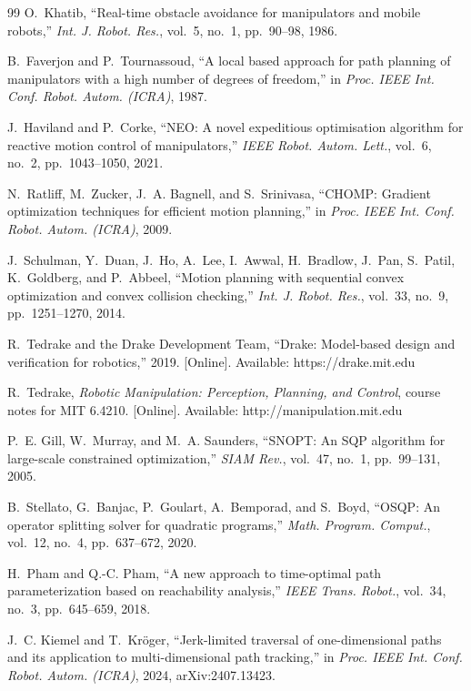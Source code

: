 \documentclass[conference]{IEEEtran}
\begin{document}
\begin{thebibliography}{99}
O.~Khatib, ``Real-time obstacle avoidance for manipulators and mobile robots,'' \emph{Int. J. Robot.
Res.}, vol.~5, no.~1, pp.~90--98, 1986.

B.~Faverjon and P.~Tournassoud, ``A local based approach for path planning of manipulators with a high
number of degrees of freedom,'' in \emph{Proc. IEEE Int. Conf. Robot. Autom. (ICRA)}, 1987.

J.~Haviland and P.~Corke, ``NEO: A novel expeditious optimisation algorithm for reactive motion control
of manipulators,'' \emph{IEEE Robot. Autom. Lett.}, vol.~6, no.~2, pp.~1043--1050, 2021.

N.~Ratliff, M.~Zucker, J.~A. Bagnell, and S.~Srinivasa, ``CHOMP: Gradient optimization techniques for
efficient motion planning,'' in \emph{Proc. IEEE Int. Conf. Robot. Autom. (ICRA)}, 2009.

J.~Schulman, Y.~Duan, J.~Ho, A.~Lee, I.~Awwal, H.~Bradlow, J.~Pan, S.~Patil, K.~Goldberg, and
P.~Abbeel, ``Motion planning with sequential convex optimization and convex collision checking,''
\emph{Int. J. Robot. Res.}, vol.~33, no.~9, pp.~1251--1270, 2014.

R.~Tedrake and the Drake Development Team, ``Drake: Model-based design and verification for robotics,''
2019. [Online]. Available: https://drake.mit.edu

R.~Tedrake, \emph{Robotic Manipulation: Perception, Planning, and Control}, course notes for MIT 6.4210.
[Online]. Available: http://manipulation.mit.edu

P.~E. Gill, W.~Murray, and M.~A. Saunders, ``SNOPT: An SQP algorithm for large-scale constrained
optimization,'' \emph{SIAM Rev.}, vol.~47, no.~1, pp.~99--131, 2005.

B.~Stellato, G.~Banjac, P.~Goulart, A.~Bemporad, and S.~Boyd, ``OSQP: An operator splitting solver for
quadratic programs,'' \emph{Math. Program. Comput.}, vol.~12, no.~4, pp.~637--672, 2020.

H.~Pham and Q.-C. Pham, ``A new approach to time-optimal path parameterization based on reachability
analysis,'' \emph{IEEE Trans. Robot.}, vol.~34, no.~3, pp.~645--659, 2018.

J.~C. Kiemel and T.~Kr\"oger, ``Jerk-limited traversal of one-dimensional paths and its application to
multi-dimensional path tracking,'' in \emph{Proc. IEEE Int. Conf. Robot. Autom. (ICRA)}, 2024,
arXiv:2407.13423.


\end{thebibliography}
\end{document}
